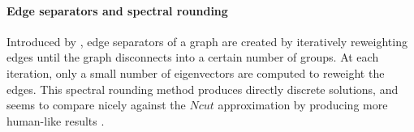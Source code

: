 \paragraph{Edge separators and spectral rounding}

Introduced by \cite{tolliver_graph_2006}, edge separators of a graph are created by iteratively reweighting edges until the graph disconnects into a certain number of groups.
At each iteration, only a small number of eigenvectors are computed to reweight the edges.
This spectral rounding method produces directly discrete solutions, and seems to compare nicely against the \(Ncut\) approximation by producing more human-like results \cite{tolliver_spectral_2006}.
